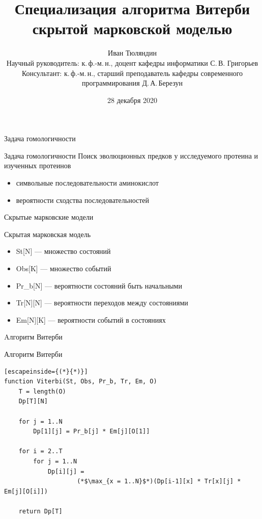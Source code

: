 \documentclass[hyperref={pdfpagelabels=false}]{beamer}
\begin{document}
  
\title[Специализация алгоритма Витерби]{Специализация алгоритма Витерби скрытой марковской моделью}  
\author[И. Тюляндин]{Иван Тюляндин\\%
Научный руководитель: к.\,ф.-м.\,н., доцент кафедры информатики С.\,В. Григорьев\\%
Консультант: к.\,ф.-м.\,н., старший преподаватель кафедры современного программирования Д.\,А.\,Березун\\%
} 
\date{28 декабря 2020} 
{
}


\begin{frame}{Задача гомологичности}
\begin{block}{Задача гомологичности}
	Поиск эволюционных предков у исследуемого протеина и изученных протеинов
	\begin{itemize}
		\item символьные последовательности аминокислот
		\item вероятности сходства последовательностей
	\end{itemize}
\end{block}
\end{frame} 


\begin{frame}{Скрытые марковские модели}
\begin{block}{Скрытая марковская модель}
\begin{itemize}
	\item St[N] — множество состояний
	\item Obs[K] — множество событий
	\item Pr\_b[N] — вероятности состояний быть начальными
	\item Tr[N][N] — вероятности переходов между состояниями
	\item Em[N][K] — вероятности событий в состояниях
\end{itemize}
\end{block}
\end{frame}


\begin{frame}[fragile]{Aлгоритм Витерби}
\begin{block}{Алгоритм Витерби}
\begin{lstlisting}[escapeinside={(*}{*)}]
function Viterbi(St, Obs, Pr_b, Tr, Em, O)
	T = length(O)
	Dp[T][N]

	for j = 1..N
		Dp[1][j] = Pr_b[j] * Em[j][O[1]]
	
	for i = 2..T
		for j = 1..N
			Dp[i][j] = 
					(*$\max_{x = 1..N}$*)(Dp[i-1][x] * Tr[x][j] * Em[j][O[i]])

	return Dp[T]
\end{lstlisting}
\end{block}
\end{frame}
\end{document}
